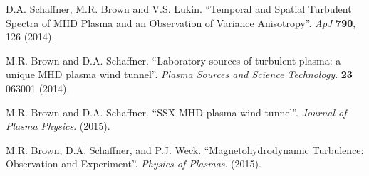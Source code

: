 \documentclass[aps,prl,amsmath,amssymb,reprint,superscriptaddress]{revtex4-1} %
\begin{document}
\begin{thebibliography}{99}
D.A. Schaffner, M.R. Brown and V.S. Lukin. ``Temporal and Spatial Turbulent Spectra of MHD Plasma and an Observation of Variance Anisotropy''. {\it ApJ} {\bf 790}, 126 (2014).

M.R. Brown and D.A. Schaffner. ``Laboratory sources of turbulent plasma: a unique MHD plasma wind tunnel''. {\it Plasma Sources and Science Technology}. {\bf 23} 063001 (2014).

M.R. Brown and D.A. Schaffner. ``SSX MHD plasma wind tunnel''. {\it Journal of Plasma Physics}. (2015).

M.R. Brown, D.A. Schaffner, and P.J. Weck. ``Magnetohydrodynamic Turbulence: Observation and Experiment''. {\it Physics of Plasmas}. (2015).

\end{thebibliography}
\end{document}
